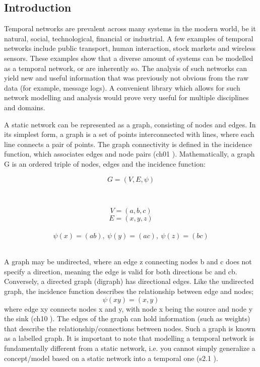 \begin{introduction}
\section{Introduction}
Temporal networks are prevalent across many systems in the modern world, be it natural, social, technological, financial or industrial. A few examples of temporal networks include public transport\cite{transport_example}, human interaction\cite{social_example}, stock markets\cite{stocks_example} and wireless sensors\cite{wireless_example}. These examples show that a diverse amount of systems can be modelled as a temporal network, or are inherently so. The analysis of such networks can yield new and useful information that was previously not obvious from the raw data (for example, message logs). A convenient library which allows for such network modelling and analysis would prove very useful for multiple disciplines and domains.

A static network can be represented as a graph, consisting of nodes and edges. In its simplest form, a graph is a set of points interconnected with lines, where each line connects a pair of points. The graph connectivity is defined in the incidence function, which associates edges and node pairs (ch01 \cite{graph_theory}). Mathematically, a graph G is an ordered triple of nodes, edges and the incidence function:

\begin{minipage}{0.4\textwidth}
    \begin{flushleft}
    \[ G = (V, E, \psi) \]
    \end{flushleft}
\end{minipage}
~
\begin{minipage}{0.4\textwidth}
    \begin{flushright}
    \[ V = (a, b, c) \]
    \[ E = (x, y, z) \]\
    \[ \psi(x) = (ab),\ \psi(y) = (ac),\ \psi(z) = (bc) \]
    \end{flushright}
\end{minipage}\\[0.25cm]
A graph may be undirected, where an edge z connecting nodes b and c does not specify a direction, meaning the edge is valid for both directions bc and cb. Conversely, a directed graph (digraph) has directional edges. Like the undirected graph, the incidence function describes the relationship between edge and nodes;
\[ \psi(xy) = (x, y) \]
where edge xy connects nodes x and y, with node x being the source and node y the sink (ch10 \cite{graph_theory}). The edges of the graph can hold information (such as weights) that describe the relationship/connections between nodes. Such a graph is known as a labelled graph. It is important to note that modelling a temporal network is fundamentally different from a static network, i.e. you cannot simply generalize a concept/model based on a static network into a temporal one (s2.1 \cite{temporal_theory}).


\end{introduction}
